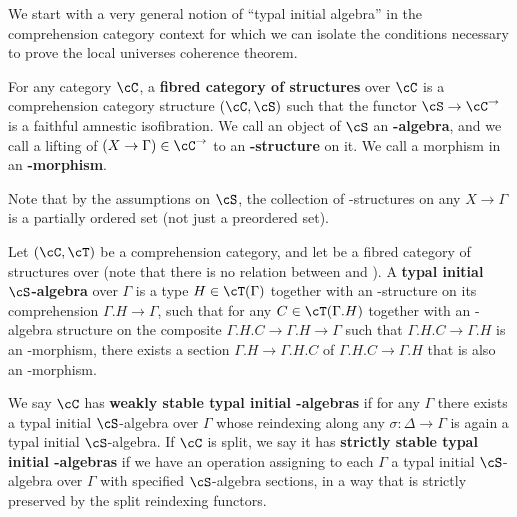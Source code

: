 \documentclass[referee]{psp}
\let\S\cS
\let\C\cC
\let\T\cT
\begin{document}
We start with a very general notion of ``typal initial algebra'' in the comprehension category context for which we can isolate the conditions necessary to prove the local universes coherence theorem.

\begin{defn}
  For any category $\C$, a \textbf{fibred category of structures} over $\C$ is a comprehension category structure $(\C,\S)$ such that the functor $\S\to\C^\to$ is a faithful amnestic isofibration.
  We call an object of $\S$ an \textbf{\S-algebra}, and we call a lifting of $(X\to \Gamma)\in\C^\to$ to \S an \textbf{\S-structure} on it.
  We call a morphism in \S an \textbf{\S-morphism}.
\end{defn}

Note that by the assumptions on $\S$, the collection of \S-structures on any $X\to \Gamma$ is a partially ordered set (not just a preordered set).

\begin{defn}
  Let $(\C,\T)$ be a comprehension category, and let \S be a fibred category of structures over \C (note that there is no relation between \S and \T).
  A \textbf{typal initial $\S$-algebra} over $\Gamma$ is a type $H\in \T(\Gamma)$ together with an \S-structure on its comprehension $\Gamma.H\to\Gamma$, such that for any $C\in\T(\Gamma.H)$ together with an \S-algebra structure on the composite $\Gamma.H.C\to\Gamma.H\to\Gamma$ such that $\Gamma.H.C\to\Gamma.H$ is an \S-morphism, there exists a section $\Gamma.H \to \Gamma.H.C$ of $\Gamma.H.C\to\Gamma.H$ that is also an \S-morphism.

  We say $\C$ has \textbf{weakly stable typal initial \S-algebras} if for any $\Gamma$ there exists a typal initial $\S$-algebra over $\Gamma$ whose reindexing along any $\sigma:\Delta\to\Gamma$ is again a typal initial $\S$-algebra.
  If $\C$ is split, we say it has \textbf{strictly stable typal initial \S-algebras} if we have an operation assigning to each $\Gamma$ a typal initial $\S$-algebra over $\Gamma$ with specified $\S$-algebra sections, in a way that is strictly preserved by the split reindexing functors.
\end{defn}
\end{document}
